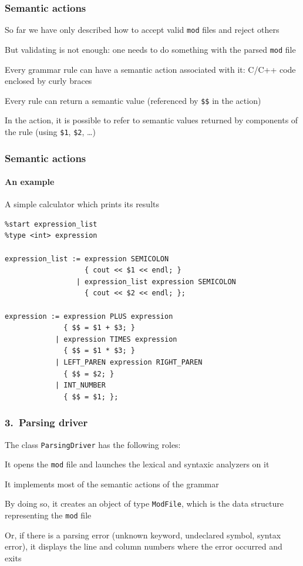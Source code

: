 \documentclass[aspectratio=169]{beamer}
\newenvironment{witemize}{\itemize\addtolength{\itemsep}{8pt}}{\enditemize}
\begin{document}
\begin{frame}
\frametitle{Semantic actions}
\begin{witemize}
\item So far we have only described how to accept valid \texttt{mod} files and reject others
\item But validating is not enough: one needs to do something with the parsed \texttt{mod} file
\item Every grammar rule can have a \alert{semantic action} associated with it: C/C++ code enclosed by curly braces
\item Every rule can return a semantic value (referenced by \texttt{\$\$} in the action)
\item In the action, it is possible to refer to semantic values returned by components of the rule (using \texttt{\$1}, \texttt{\$2}, \ldots)
\end{witemize}
\end{frame}

\begin{frame}[fragile]
\frametitle{Semantic actions}
\framesubtitle{An example}
\begin{block}{A simple calculator which prints its results}
\begin{footnotesize}
\begin{verbatim}
%start expression_list
%type <int> expression

expression_list := expression SEMICOLON
                   { cout << $1 << endl; }
                 | expression_list expression SEMICOLON
                   { cout << $2 << endl; };

expression := expression PLUS expression
              { $$ = $1 + $3; }
            | expression TIMES expression
              { $$ = $1 * $3; }
            | LEFT_PAREN expression RIGHT_PAREN
              { $$ = $2; }
            | INT_NUMBER
              { $$ = $1; };
\end{verbatim}
\end{footnotesize}
\end{block}
\end{frame}

\begin{frame}
\frametitle{3.\ Parsing driver}

The class \texttt{ParsingDriver} has the following roles:
\begin{witemize}
\item It opens the \texttt{mod} file and launches the lexical and syntaxic analyzers on it
\item It implements most of the semantic actions of the grammar
\item By doing so, it creates an object of type \texttt{ModFile}, which is the data structure representing the \texttt{mod} file
\item Or, if there is a parsing error (unknown keyword, undeclared symbol, syntax error), it displays the line and column numbers where the error occurred and exits
\end{witemize}
\end{frame}
\end{document}
